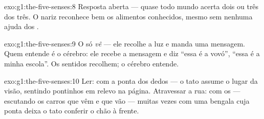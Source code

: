 \begin{solution}{exo:g1:the-five-senses:8}
Resposta aberta --- quase todo mundo acerta dois ou três dos três. O
nariz reconhece bem os alimentos conhecidos, mesmo sem nenhuma ajuda
dos .
\end{solution}

\begin{solution}{exo:g1:the-five-senses:9}
O  só \emph{vê} --- ele recolhe a luz e manda uma mensagem. Quem
entende é o cérebro: ele recebe a mensagem e diz ``essa é a vovó'',
``essa é a minha escola''. Os sentidos recolhem; o cérebro entende.
\end{solution}

\begin{solution}{exo:g1:the-five-senses:10}
Ler: com a ponta dos dedos --- o tato assume o lugar da visão,
sentindo pontinhos em relevo na página. Atravessar a rua: com os
 --- escutando os carros que vêm e que vão --- muitas vezes
com uma bengala cuja ponta deixa o tato conferir o chão à frente.
\end{solution}
